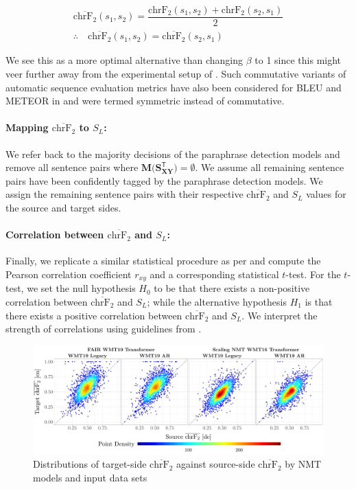 \documentclass[11pt,a4paper]{article}
\begin{document}
\begin{gather}
  \overline{\text{chrF}_2}(s_1,s_2) = \dfrac{\text{chrF}_2(s_1,s_2) + \text{chrF}_2(s_2,s_1)}{2} \\[5pt]
  \therefore \quad \overline{\text{chrF}_2}(s_1,s_2) = \overline{\text{chrF}_2}(s_2,s_1)
\end{gather}

We see this as a more optimal alternative than changing $\beta$ to 1 since this might veer further away from the experimental setup of \citet{michel2019evaluation}. Such commutative variants of automatic sequence evaluation metrics have also been considered for BLEU and METEOR in \citet{wieting-etal-2019-beyond} and were termed symmetric instead of commutative.

\paragraph{Mapping $\overline{\text{chrF}_2}$ to $S_L$:}
We refer back to the majority decisions of the paraphrase detection models and remove all sentence pairs where $\mathbf{M(S_{XY}^{\mathsf{T}}}) = \emptyset$. We assume all remaining sentence pairs have been confidently tagged by the paraphrase detection models. We assign the remaining sentence pairs with their respective $\overline{\text{chrF}_2}$ and $S_L$ values for the source and target sides. 

\paragraph{Correlation between $\overline{\text{chrF}_2}$ and $S_L$:} Finally, we replicate a similar statistical procedure as per \citet{michel2019evaluation} and compute the Pearson correlation coefficient $r_{xy}$ and a corresponding statistical $t$-test. For the $t$-test, we set the null hypothesis $H_0$ to be that there exists a non-positive correlation between $\overline{\text{chrF}_2}$ and $S_L$; while the alternative hypothesis $H_1$ is that there exists a positive correlation between $\overline{\text{chrF}_2}$ and $S_L$. We interpret the strength of correlations using guidelines from \citet{schober2018correlation}.     

\begin{figure}
  \centering 
  \includegraphics[trim={0cm 0cm 0cm 0cm},clip,width=\textwidth]{chrf_nmt.pdf}
  \caption{Distributions of target-side $\overline{\text{chrF}_2}$ against source-side $\overline{\text{chrF}_2}$ by NMT models and input data sets}
  \label{chrf_distribution}
\end{figure}
\end{document}
